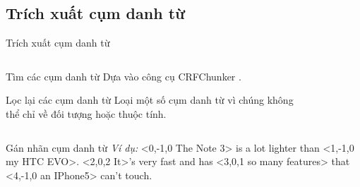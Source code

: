 \documentclass[9pt,xcolor=table]{beamer}
\begin{document}
	\subsection{Trích xuất cụm danh từ}
	\begin{frame}{Trích xuất cụm danh từ}		
		\begin{columns}[t]
			\begin{column}{0.4\textwidth}
			   	\begin{block}{Tìm các cụm danh từ}
	   				Dựa vào công cụ CRFChunker \footnotemark.
				\end{block}
				\begin{block}{Lọc lại các cụm danh từ}
			   		Loại một số cụm danh từ vì chúng không thể chỉ về đối tượng hoặc thuộc tính.				
				\end{block}
			\end{column}
			\begin{column}{0.6\textwidth}  %
			 	\begin{figure}[H]
					\LARGE 
					\centering				
					\resizebox{65mm}{!}{}	
				\end{figure}
			\end{column}
		\end{columns}
		\begin{columns}[t]
			\begin{column}{\textwidth}
			   	\begin{block}{Gán nhãn cụm danh từ}					
					\textit{Ví dụ:} <0,-1,0 The Note 3> is a lot lighter than <1,-1,0 my HTC EVO>. <2,0,2 It>'s very fast and has <3,0,1 so many features> that <4,-1,0 an IPhone5> can't touch. 
				\end{block}					
			\end{column}			
		\end{columns}
	\end{frame}
\end{document}
